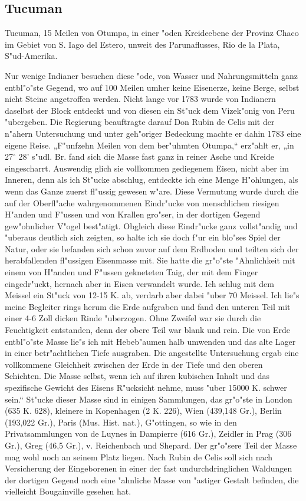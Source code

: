 \documentclass[a4paper, 11pt, oneside]{article}
\begin{document}
\subsection{Tucuman}

Tucuman, 15 Meilen von Otumpa, in einer "oden Kreideebene
der Provinz Chaco im Gebiet von S. Iago del Estero, unweit des Parunaflusses, Rio de la Plata, S"ud-Amerika.

Nur wenige Indianer besuchen diese "ode, von Wasser und Nahrungsmitteln ganz entbl"o"ste Gegend, wo auf 100 Meilen umher keine Eisenerze, keine Berge, selbst nicht Steine angetroffen werden. Nicht lange vor 1783 wurde von Indianern daselbst der Block entdeckt und von diesen ein St"uck dem Vizek"onig von Peru "ubergeben. Die Regierung beauftragte darauf Don Rubin de Celis mit der n"ahern Untersuchung und unter geh"origer Bedeckung machte er dahin 1783 eine eigene Reise. „F"unfzehn Meilen von dem ber"uhmten Otumpa,“ erz"ahlt er, „in 27$^\circ$ 28' s"udl. Br. fand sich die Masse fast ganz in reiner Asche und Kreide eingescharrt. Auswendig glich sie vollkommen gediegenem Eisen, nicht aber im Inneren, denn als ich St"ucke abschlug, entdeckte ich eine Menge H"ohlungen, als wenn das Ganze zuerst fl"ussig gewesen w"are. Diese Vermutung wurde durch die auf der Oberfl"ache wahrgenommenen Eindr"ucke von menschlichen riesigen H"anden und F"ussen und von Krallen gro"ser, in der dortigen Gegend gew"ohnlicher V"ogel best"atigt. Obgleich diese Eindr"ucke ganz vollst"andig und "uberaus deutlich sich zeigten, so halte ich sie doch f"ur ein blo"ses Spiel der Natur, oder sie befanden sich schon zuvor auf dem Erdboden und teilten sich der herabfallenden fl"ussigen Eisenmasse mit. Sie hatte die gr"o"ste "Ahnlichkeit mit einem von H"anden und F"ussen gekneteten Taig, der mit dem Finger eingedr"uckt, hernach aber in Eisen verwandelt wurde. Ich schlug mit dem Meissel ein St"uck von 12-15 K. ab, verdarb aber dabei "uber 70 Meissel. Ich lie"s meine Begleiter rings herum die Erde aufgraben und fand den unteren Teil mit einer 4-6 Zoll dicken Rinde "uberzogen. Ohne Zweifel war sie durch die Feuchtigkeit entstanden, denn der obere Teil war blank und rein. Die von Erde entbl"o"ste Masse lie"s ich mit Hebeb"aumen halb umwenden und das alte Lager in einer betr"achtlichen Tiefe ausgraben. Die angestellte Untersuchung ergab eine vollkommene Gleichheit zwischen der Erde in der Tiefe und den oberen Schichten. Die Masse selbst, wenn ich auf ihren kubischen Inhalt und das spezifische Gewicht des Eisens R"ucksicht nehme, muss "uber 15000 K. schwer sein.“ St"ucke dieser Masse sind in einigen Sammlungen, das gr"o"ste in London (635 K. 628), kleinere in Kopenhagen (2 K. 226), Wien (439,148 Gr.), Berlin (193,022 Gr.), Paris (Mus. Hist. nat.), G"ottingen, so wie in den Privatsammlungen von de Luynes in Dampierre (616 Gr.), Zeidler in Prag (306 Gr.), Greg (46,5 Gr.), v. Reichenbach und Shepard. Der gr"o"sere Teil der Masse mag wohl noch an seinem Platz liegen. Nach Rubin de Celis soll sich nach Versicherung der Eingeborenen in einer der fast undurchdringlichen Waldungen der dortigen Gegend noch eine "ahnliche Masse von "astiger Gestalt befinden, die vielleicht Bougainville gesehen hat.
\end{document}
